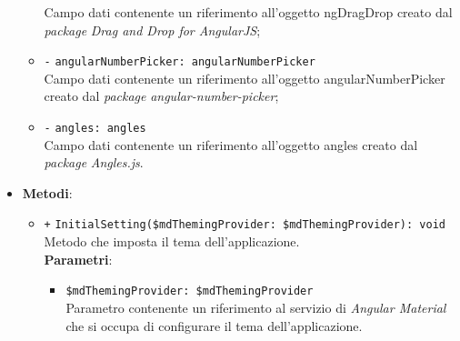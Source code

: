 \begin{itemize}
\begin{itemize}
				Campo dati contenente un riferimento all'oggetto ngDragDrop creato dal \textit{package} \textit{Drag and Drop for AngularJS};
				\item \texttt{-} \texttt{angularNumberPicker: angularNumberPicker} \\
				Campo dati contenente un riferimento all'oggetto angularNumberPicker creato dal \textit{package} \textit{angular-number-picker};
				\item \texttt{-} \texttt{angles: angles} \\
				Campo dati contenente un riferimento all'oggetto angles creato dal \textit{package} \textit{Angles.js}.
			\end{itemize}
			\item \textbf{Metodi}: 
			\begin{itemize}
				\item \texttt{+} \texttt{InitialSetting(\$mdThemingProvider: \$mdThemingProvider): void} \\
				Metodo che imposta il tema dell'applicazione. \\
				\textbf{Parametri}:
				\begin{itemize}
					\item \texttt{\$mdThemingProvider: \$mdThemingProvider}\\ Parametro contenente un riferimento al servizio di \textit{Angular Material} che si occupa di configurare il tema dell'applicazione.
				\end{itemize}			
			\end{itemize}
		\end{itemize}
		